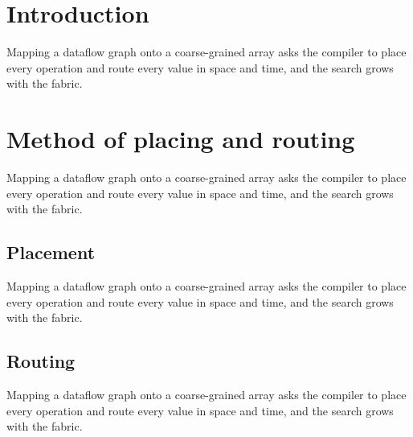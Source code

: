\documentclass{article}
\begin{document}
\tableofcontents
\section{Introduction}
Mapping a dataflow graph onto a coarse-grained array asks the compiler to place every operation and route every value in space and time, and the search grows with the fabric.
\section{Method of placing and routing}
Mapping a dataflow graph onto a coarse-grained array asks the compiler to place every operation and route every value in space and time, and the search grows with the fabric.
\subsection{Placement}
Mapping a dataflow graph onto a coarse-grained array asks the compiler to place every operation and route every value in space and time, and the search grows with the fabric.
\subsection{Routing}
Mapping a dataflow graph onto a coarse-grained array asks the compiler to place every operation and route every value in space and time, and the search grows with the fabric.
\end{document}
